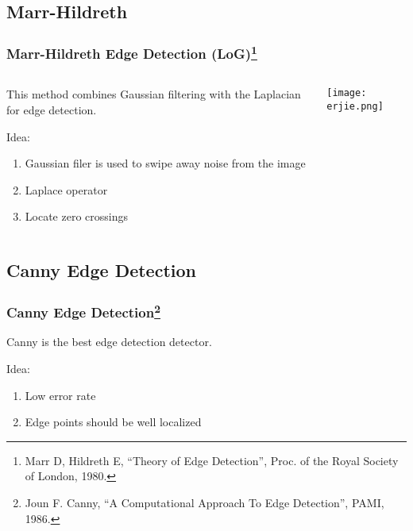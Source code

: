 \documentclass[notheorems,serif,table,compress]{beamer}  %
\begin{document}
\subsection{Marr-Hildreth}
\begin{frame}
\frametitle{Marr-Hildreth Edge Detection (LoG)\footnote{Marr D, Hildreth E, ``Theory of Edge Detection'', Proc. of the Royal Society of London, 1980.}}
\begin{columns}
\begin{column}{0.55\linewidth}
This method combines Gaussian filtering with the Laplacian for edge detection.\newline

{\color{blue}Idea:}
    \begin{enumerate}
    \item {\color{blue}Gaussian filer} is used to swipe away noise from the image
    \item {\color{blue}Laplace operator}
    \item  Locate {\color{blue}zero crossings}
    \end{enumerate}
\end{column}
\begin{column}{0.45\linewidth}
\centering\texttt{[image: erjie.png]}
\end{column}
\end{columns}\vspace{1ex}
\end{frame}

\subsection{Canny Edge Detection}
\begin{frame}
\frametitle{Canny Edge Detection\footnote{Joun F. Canny, ``A Computational Approach To Edge Detection'', PAMI, 1986.}}
Canny is the best edge detection detector.\newline

{\color{blue}Idea:}
\begin{enumerate}
\item Low error rate
\item Edge points should be well localized
\end{enumerate}
\end{frame}
\end{document}
